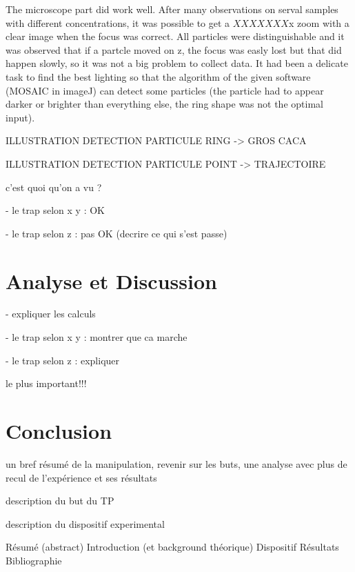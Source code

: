 \documentclass[a4paper,12pt,twoside]{article}	%
\begin{document}
The microscope part did work well. After many observations on serval samples with different concentrations, it was possible to get a $XXXXXXX $x zoom with a clear image when the focus was correct. All particles were distinguishable and it was observed that if a partcle moved on z, the focus was easly lost but that did happen slowly, so it was not a big problem to collect data. It had been a delicate task to find the best lighting so that the algorithm of the given software (MOSAIC in imageJ) can detect some particles (the particle had to appear darker or brighter than everything else, the ring shape was not the optimal input).

ILLUSTRATION DETECTION PARTICULE RING -> GROS CACA

ILLUSTRATION DETECTION PARTICULE POINT -> TRAJECTOIRE

c'est quoi qu'on a vu ?

- le trap selon x y : OK

- le trap selon z : pas OK (decrire ce qui s'est passe)

\section{Analyse et Discussion}

- expliquer les calculs

- le trap selon x y : montrer que ca marche

- le trap selon z : expliquer

le plus important!!!

\section{Conclusion}

un bref résumé de la manipulation, revenir sur les buts, une analyse avec plus de recul de l'expérience et ses résultats

description du but du TP

description du dispositif experimental

Résumé (abstract)
Introduction (et background théorique)
Dispositif
Résultats
Bibliographie
\end{document}
